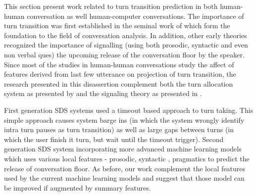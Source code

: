 This section present work related to turn transition prediction in both human-human conversation as well human-computer conversations. 
The importance of turn transition was first established in the seminal work of \cite{sacks1974simplest} which form the foundation to the field
of conversation analysis. In addition, other early theories recognized the importance of signalling (using both prosodic, syntactic and even non
verbal ques) the upcoming release of the conversation floor by the speaker.  Since most of the studies in human-human conversations study the affect of
features derived from last few utterance on projection of turn transition, the research presented in this disassertion complement both the turn
allocation system as presented by \cite{sacks1974simplest} and the signaling theory as presented in \cite{duduncan1972some}. 

First generation SDS systems used a timeout based approach to turn taking. This simple approach causes system barge ins (in which the system wrongly
identify intra turn pauses as turn transition) as well as large gaps between turns (in which the user finish it turn, but wait until the timeout trigger).
Second generation SDS system incorporating more advanced machine learning models which uses various local features - prosodic, syntactic , pragmatics to 
predict the release of conversation floor. As before, our work complement the local features used by the current machine learning models and suggest that
those model can be improved if augmented by summary features.        
   
